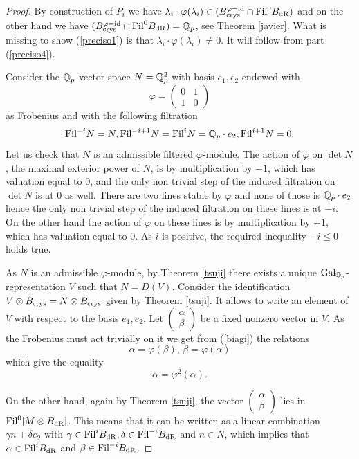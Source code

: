 \documentclass[11pt]{amsart}
\begin{document}
\begin{proof}

By construction of $P_i$ we have   $ \lambda_i \cdot\varphi(\lambda_i) \in (B_{\textnormal{crys}}^{\varphi=\mathrm{id}} \cap \textnormal{Fil}^0B_{\mathrm{dR}})$  and on the other hand we have  $(B_{\textnormal{crys}}^{\varphi=\mathrm{id}} \cap \textnormal{Fil}^0B_{\mathrm{dR}})=\mathbb{Q}_p$, see Theorem \ref{javier}. What is missing to show (\ref{preciso1}) is that $\lambda_i \cdot\varphi(\lambda_i)\neq 0.$ It will follow from part (\ref{preciso4}).

  Consider the $\mathbb{Q}_p$-vector space $N=\mathbb{Q}_p^2$ with basis $e_1,e_2$ endowed with 
\begin{equation}\label{biagi}\varphi=\begin{pmatrix}
0 & 1 \\
1 & 0
\end{pmatrix}
\end{equation}
as Frobenius and with the following filtration
\[\textnormal{Fil}^{-i}N=N, \textnormal{Fil}^{-i+1}N =\textnormal{Fil}^i N=\mathbb{Q}_p\cdot e_2, \textnormal{Fil}^{i+1} N=0.  \]
Let us  check that $N$ is an admissible filtered $\varphi$-module.  The action of $\varphi$ on $\det N$, the maximal exterior power of $N$, is by multiplication by $-1$, which has valuation equal to $0$, and the only non trivial step of the induced filtration on $\det N$ is at $0$ as well. There are two lines  stable by $\varphi$ and none of those is $\mathbb{Q}_p\cdot e_2$ hence the only non trivial step of the induced filtration on these lines is at $-i$. On the other hand the action of $\varphi$ on these lines is by multiplication by $\pm 1$, which has valuation equal to $0$. As $i$ is  positive, the required inequality  $-i \leq 0$ holds true.
 
 As $N$ is an admissible $\varphi$-module, by Theorem \ref{tsuji} there exists a unique $\textnormal{Gal}_{\mathbb{Q}_p}$-representation $V$ such that $N=D(V)$. 
 Consider the identification $V \otimes B_{\textnormal{crys}}= N \otimes B_{\textnormal{crys}}$ given by  Theorem \ref{tsuji}. It allows to write an element of $V$ with respect to the basis $e_1,e_2$. Let $\begin{pmatrix} \alpha \\
\beta
 \end{pmatrix}$ be a fixed nonzero vector in $V$. As the Frobenius must act trivially on it we get from (\ref{biagi})  the relations
 \[ \alpha=  \varphi(\beta), \,
   \beta= \varphi(\alpha) \]
  which give the equality
  \begin{equation}  \alpha=  \varphi^2(\alpha).\end{equation}
  
    On the other hand, again by Theorem \ref{tsuji}, the vector $\begin{pmatrix} \alpha \\
\beta
 \end{pmatrix}$ lies in $ \textnormal{Fil}^0[M \otimes B_{\mathrm{dR}}]$. This means that it can be written as a linear combination $\gamma n + \delta e_2$ with $\gamma \in \textnormal{Fil}^{i}B_{\mathrm{dR}}, \delta \in \textnormal{Fil}^{-i} B_{\mathrm{dR}}$ and $n \in N$, which implies that $\alpha \in \textnormal{Fil}^{i}B_{\mathrm{dR}}$ and  $\beta \in \textnormal{Fil}^{-i}B_{\mathrm{dR}}$. 
 

\end{proof}
\end{document}

